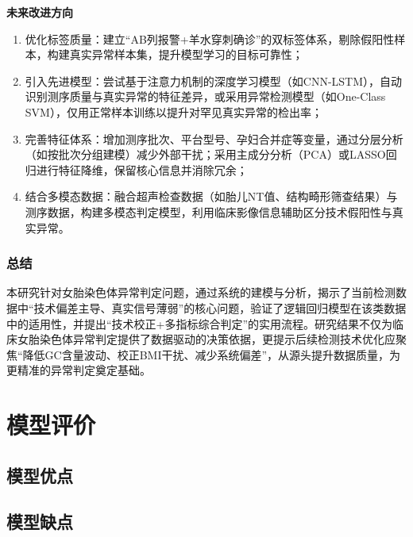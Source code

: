 \documentclass[withoutpreface,bwprint]{cumcmthesis} %
\begin{document}
\textbf{未来改进方向}
\begin{enumerate}
    \item 优化标签质量：建立“AB列报警+羊水穿刺确诊”的双标签体系，剔除假阳性样本，构建真实异常样本集，提升模型学习的目标可靠性；
    \item 引入先进模型：尝试基于注意力机制的深度学习模型（如CNN-LSTM），自动识别测序质量与真实异常的特征差异，或采用异常检测模型（如One-Class SVM），仅用正常样本训练以提升对罕见真实异常的检出率； 
    \item 完善特征体系：增加测序批次、平台型号、孕妇合并症等变量，通过分层分析（如按批次分组建模）减少外部干扰；采用主成分分析（PCA）或LASSO回归进行特征降维，保留核心信息并消除冗余； 
    \item 结合多模态数据：融合超声检查数据（如胎儿NT值、结构畸形筛查结果）与测序数据，构建多模态判定模型，利用临床影像信息辅助区分技术假阳性与真实异常。
\end{enumerate}


\subsubsection{总结}
本研究针对女胎染色体异常判定问题，通过系统的建模与分析，揭示了当前检测数据中“技术偏差主导、真实信号薄弱”的核心问题，验证了逻辑回归模型在该类数据中的适用性，并提出“技术校正+多指标综合判定”的实用流程。研究结果不仅为临床女胎染色体异常判定提供了数据驱动的决策依据，更提示后续检测技术优化应聚焦“降低GC含量波动、校正BMI干扰、减少系统偏差”，从源头提升数据质量，为更精准的异常判定奠定基础。




\section{模型评价}
\subsection{模型优点}

\subsection{模型缺点}




\begin{appendices}
\end{appendices}
\end{document}
